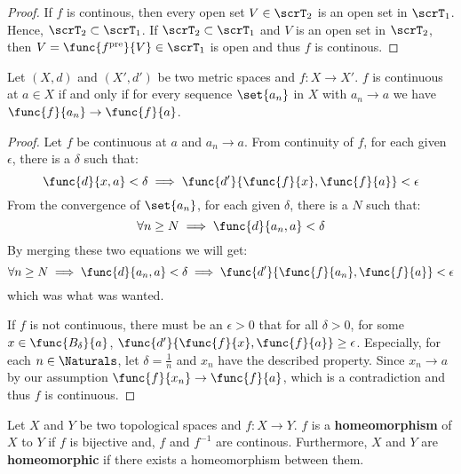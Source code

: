 \begin{proof}
    If \(f\) is continous, then every open set \(V \in \scrT_2\) is an open set in \(\scrT_1\). Hence, \(\scrT_2 \subset \scrT_1\). If \(\scrT_2 \subset \scrT_1\) and \(V\) is an open set in \(\scrT_2\), then \(V = \func{f^{\mathrm{pre}}}{V} \in \scrT_1\) is open and thus \(f\) is continous.
\end{proof}

\begin{theorem}
    Let \((X,d)\) and \((X',d')\) be two metric spaces and \( f: X \to X' \). \(f\) is continuous at \( a \in X\) if and only if for every sequence \(\set{ a_n}\) in \(X\) with \(a_n \to a\) we have \(\func{f}{a_n} \to \func{f}{a}\).
\end{theorem}

\begin{proof}
    Let \(f\) be continuous at \(a\) and \(a_n \to a\). From continuity of \(f\), for each given \(\epsilon\), there is a \(\delta\) such that:
    \begin{equation*}
        \func{d}{x,a} < \delta \implies \func{d'}{\func{f}{x},\func{f}{a}} < \epsilon
    \end{equation*}
    From the convergence of \(\set{a_n}\), for each given \(\delta\), there is a \(N\) such that:
    \begin{equation*}
        \forall n \geq N \implies \func{d}{a_n,a} < \delta
    \end{equation*}
    By merging these two equations we will get:
    \begin{equation*}
        \forall n \geq N \implies  \func{d}{a_n,a} < \delta \implies \func{d'}{\func{f}{a_n},\func{f}{a}} < \epsilon
    \end{equation*}
    which was what was wanted.

    If \(f\) is not continuous, there must be an \(\epsilon > 0\) that for all \(\delta > 0 \), for some  \(x \in \func{B_\delta}{a}\), \( \func{d'}{\func{f}{x},\func{f}{a}} \geq \epsilon\). Especially, for each \(n \in \Naturals\), let \(\delta = \frac{1}{n}\) and \(x_n\) have the described property. Since \(x_n \to a\) by our assumption \(\func{f}{x_n} \to \func{f}{a}\), which is a contradiction and thus \(f\) is continuous.
\end{proof}

\begin{definition}
    Let \(X\) and \(Y\) be two topological spaces and \(f:X \to Y\). \(f\) is a \textbf{homeomorphism} of \(X\) to \(Y\) if \(f\) is bijective and, \(f\) and \(f^{-1}\) are continous. Furthermore, \(X\) and \(Y\) are \textbf{homeomorphic} if there exists a homeomorphism between them.
\end{definition}

